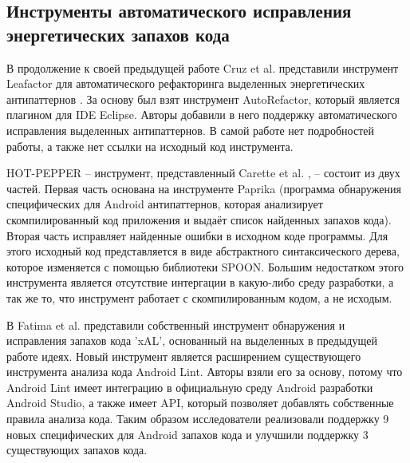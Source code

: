 \subsection{Инструменты автоматического исправления \\ энергетических запахов кода}
В продолжение к своей предыдущей работе \cite{cruz2017performance} Cruz et al. представили инструмент Leafactor для автоматического рефакторинга выделенных энергетических антипаттернов \cite{cruz2018using}. За основу был взят инструмент AutoRefactor, который является плагином для IDE Eclipse. Авторы добавили в него поддержку автоматического исправления выделенных антипаттернов. В самой работе нет подробностей работы, а также нет ссылки на исходный код инструмента.

HOT-PEPPER -- инструмент, представленный Carette et al. \cite{carette2017investigating}, -- состоит из двух частей. Первая часть основана на инструменте Paprika (программа обнаружения специфических для Android антипаттернов, которая анализирует скомпилированный код приложения и выдаёт список найденных запахов кода). Вторая часть исправляет найденные ошибки в исходном коде программы. Для этого исходный код представляется в виде абстрактного синтаксического дерева, которое изменяется с помощью библиотеки SPOON. Большим недостатком этого инструмента является отсутствие интергации в какую-либо среду разработки, а так же то, что инструмент работает с скомпилированным кодом, а не исходым.

В \cite{fatima2020detection} Fatima et al. представили собственный инструмент обнаружения и исправления запахов кода 'xAL', основанный на выделенных в предыдущей работе идеях. Новый инструмент является расширением существующего инструмента анализа кода Android Lint. Авторы взяли его за основу, потому что Android Lint имеет интеграцию в официальную среду Android разработки Android Studio, а также имеет API, который позволяет добавлять собственные правила анализа кода. Таким образом исследователи реализовали поддержку 9 новых специфических для Android запахов кода и улучшили поддержку 3 существующих запахов кода.

